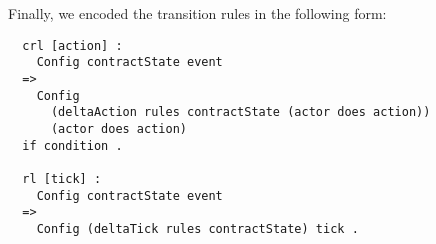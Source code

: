 \documentclass{article}
\begin{document}
Finally, we encoded the transition rules in the following form:
\begin{lstlisting}
  crl [action] :
    Config contractState event
  =>
    Config
      (deltaAction rules contractState (actor does action))
      (actor does action)
  if condition .

  rl [tick] :
    Config contractState event
  =>
    Config (deltaTick rules contractState) tick .
\end{lstlisting}





\end{document}
